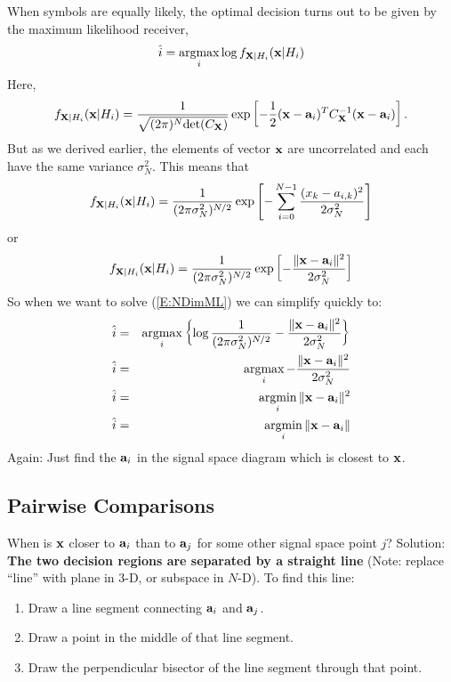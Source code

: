 When symbols are equally likely, the optimal decision turns out to be given by the maximum likelihood receiver,
\begin{equation} \label{E:NDimML}
  \hat{i} = \mathop{\mbox{argmax}}_{i} \log f_{\mathbf{X}|H_i}(\mathbf{x}|H_i)
\end{equation}
Here,
\[
 f_{\mathbf{X}|H_i}(\mathbf{x}|H_i) = \frac{1}{\sqrt{(2\pi)^{N} \mbox{det}(C_{\mathbf{X}})} } \exp \left[ -\frac{1}{2}(\mathbf{x}-\mathbf{a}_i)^T  C_{\mathbf{X}}^{-1}
  (\mathbf{x}-\mathbf{a}_i) \right].
\]
But as we derived earlier, the elements of vector $\mathbf{x}$ are uncorrelated and each have the same variance $\sigma_N^2$.  This means that 
\[
 f_{\mathbf{X}|H_i}(\mathbf{x}|H_i) = \frac{1}{(2\pi\sigma_N^2)^{N/2} } \exp \left[ - \sum_{i=0}^{N-1} \frac{(x_k - a_{i,k} )^2 }{2\sigma_N^2} \right]
\]
or
\[
 f_{\mathbf{X}|H_i}(\mathbf{x}|H_i) = \frac{1}{(2\pi\sigma_N^2)^{N/2} } \exp \left[ - \frac{\|\mathbf{x} - \mathbf{a}_{i}\|^2 }{2\sigma_N^2} \right]
\]
So when we want to solve (\ref{E:NDimML}) we can simplify quickly to:
\begin{eqnarray}
   \hat{i} &=& \mathop{\mbox{argmax}}_{i} \left\{ \log \frac{1}{(2\pi\sigma_N^2)^{N/2} }  -\frac{\|\mathbf{x} - \mathbf{a}_i \|^2 }{2\sigma_N^2} \right\}
   \nonumber \\ 
   \hat{i} &=& \mathop{\mbox{argmax}}_{i} - \frac{\|\mathbf{x} - \mathbf{a}_i \|^2 }{2\sigma_N^2}
   \nonumber \\ 
   \hat{i} &=& \mathop{\mbox{argmin}}_{i} \|\mathbf{x} - \mathbf{a}_i \|^2 
   \nonumber \\ 
   \hat{i} &=& \mathop{\mbox{argmin}}_{i} \|\mathbf{x} - \mathbf{a}_i \|
\end{eqnarray}
Again:  Just find the $\mathbf{a}_i$ in the signal space diagram which is
closest to $\mathbf{x}$.

\subsection{Pairwise Comparisons}

When is $\mathbf{x}$ closer to $\mathbf{a}_i$ than to $\mathbf{a}_j$ for some other
signal space point $j$? Solution: \textbf{The two decision regions
are separated by a straight line} (Note: replace ``line'' with plane
in 3-D, or subspace in $N$-D).  To find this line:
\begin{enumerate}
  \item Draw a line segment connecting $\mathbf{a}_i$ and $\mathbf{a}_j$.
  \item Draw a point in the middle of that line segment.
  \item Draw the perpendicular bisector of the line segment through
  that point.
\end{enumerate}


